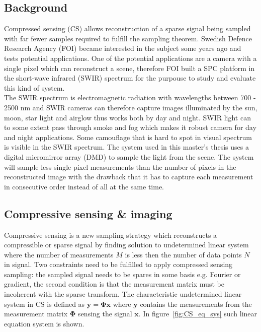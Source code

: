 \subsection{Background}
Compressed sensing (CS) allows reconstruction of a sparse signal being sampled with far fewer samples required to fulfill the sampling theorem. Swedish Defence Research Agency (FOI) became interested in the subject some years ago and tests potential applications. One of the potential applications are a camera with a single pixel which can reconstruct a scene, therefore FOI built a SPC platform in the short-wave infrared (SWIR) spectrum for the purpouse to study and evaluate this kind of system.\\[0.1in]

The SWIR spectrum is electromagnetic radiation with wavelengths between 700 - 2500 nm and SWIR cameras can therefore capture images illuminated by the sun, moon, star light and airglow thus works both by day and night. SWIR light can to some extent pass through smoke and fog which makes it robust camera for day and night applications. Some camouflage that is hard to spot in visual spectrum is visible in the SWIR spectrum. The system used in this master’s thesis uses a digital micromirror array (DMD) to sample the light from the scene. The system will sample less single pixel measurements than the number of pixels in the reconstructed image with the drawback that it has to capture each measurement in consecutive order instead of all at the same time.

\subsection{Compressive sensing \& imaging}
Compressive sensing is a new sampling strategy which reconstructs a compressible or sparse signal by finding solution to undetermined linear system where the number of measurements $M$ is less then the number of data points $N$ in signal. Two constraints need to be fulfilled to apply compressed sensing sampling: the sampled signal needs to be spares in some basis e.g. Fourier or gradient, the second condition is that the measurement matrix must be incoherent with the sparse transform. The characteristic  undetermined linear system in CS is defined as $ \mathbf{y} = \mathbf{\Phi}\mathbf{x}$ where $\mathbf{y}$ contains the measurements from the measurement matrix $\mathbf{\Phi}$ sensing the signal $\mathbf{x}$. In figure~\ref{fig:CS_eq_sys} such linear equation system is shown.

